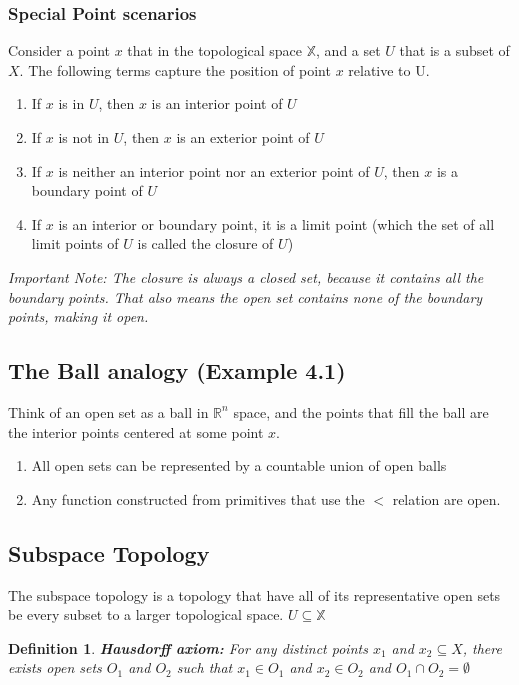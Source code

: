 \documentclass[11pt]{article}
\newtheorem{definition}[theorem]{Definition}
\begin{document}
\subsubsection{Special Point scenarios}
Consider a point $x$ that in the topological space $\mathbb{X}$, and a set $U$ that is a subset of $X$. The following terms
capture the position of point $x$ relative to U.
\begin{enumerate}
  \item If $x$ is in $U$, then $x$ is an interior point of $U$
  \item If $x$ is not in $U$, then $x$ is an exterior point of $U$
  \item If $x$ is neither an interior point nor an exterior point of $U$, then $x$ is a boundary point of $U$
  \item If $x$ is an interior or boundary point, it is a limit point (which the set of all limit points of $U$ 
  is called the closure of $U$)
\end{enumerate}

\em Important Note: The closure is always a closed set, because it contains all the boundary points. That also means
the open set contains none of the boundary points, making it open.

\subsection{The Ball analogy (Example 4.1)}
Think of an open set as a ball in $\mathbb{R}^n$ space, and the points that fill the ball are the interior points
centered at some point $x$.

\begin{enumerate}
  \item All open sets can be represented by a countable union of open balls
  \item Any function constructed from primitives that use the $<$ relation are open.
\end{enumerate}

\subsection{Subspace Topology}
The subspace topology is a topology that have all of its representative open sets be every subset to a larger 
topological space. $U \subseteq \mathbb{X}$

\begin{definition}
  \textbf{Hausdorff axiom:} For any distinct points $x_1$ and $x_2 \subseteq X$, there exists open sets
  $O_1$ and $O_2$ such that $x_1 \in O_1$ and $x_2 \in O_2$ and $O_1 \cap O_2 = \emptyset$
\end{definition}
\end{document}
